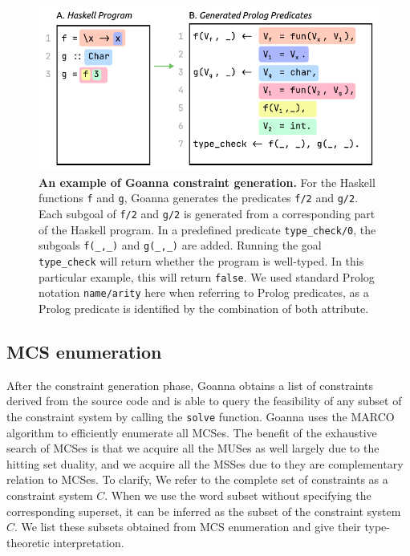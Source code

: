 \documentclass[pdflatex,sn-mathphys-num]{sn-jnl}%
\begin{document}
  \begin{figure}[htb]
        \centering
    \includegraphics[width=0.7\linewidth]{images/Translation-Example}
        \caption[An example of Goanna constraint generation]{\textbf{An example of Goanna constraint generation.} For the Haskell functions \texttt{f} and \texttt{g}, Goanna generates the predicates \texttt{f/2} and \texttt{g/2}. Each subgoal of \texttt{f/2} and \texttt{g/2} is generated from a corresponding part of the Haskell program. In a predefined predicate \texttt{type\_check/0}, the subgoals \texttt{f(\_,\_)} and \texttt{g(\_,\_)} are added. Running the goal \texttt{type\_check} will return whether the program is well-typed. In this particular example, this will return \texttt{false}. We used standard Prolog notation \texttt{name/arity} here when referring to Prolog predicates, as a Prolog predicate is identified by the combination of both attribute. 
}
        \label{fig:translation-example}
    \end{figure}
    

    \subsection{MCS enumeration} \label{sub:enumeration}
    After the constraint generation phase, Goanna obtains a list of constraints derived from the source code and is able to query the feasibility of any subset of the constraint system by calling the \texttt{solve} function. Goanna uses the MARCO algorithm \cite{Liffiton2016-xi} to efficiently enumerate all MCSes. The benefit of the exhaustive search of MCSes is that we acquire all the MUSes as well largely due to the hitting set duality, and we acquire all the MSSes due to they are complementary relation to MCSes.  To clarify, We refer to the complete set of constraints as a constraint system $C$. When we use the word subset without specifying the corresponding superset, it can be inferred as the subset of the constraint system $C$. We list these subsets obtained from MCS enumeration and give their type-theoretic interpretation. 
    
\end{document}

